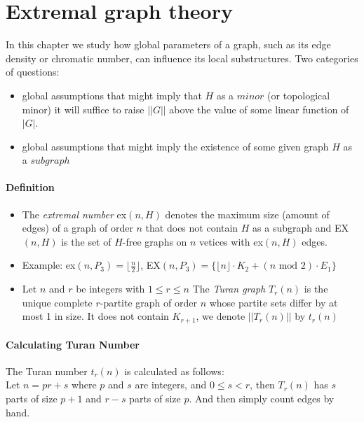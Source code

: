 \section{Extremal graph theory}
In this chapter we study how global parameters of a graph, such as its edge density 
or chromatic number, can influence its local substructures.
Two categories of questions:
\begin{itemize}
    \item global assumptions that might imply that $ H $ as a $minor$ (or topological minor)
    it will suffice to raise $ ||G|| $ above the value of some linear function 
    of $|G|$.
    \item global assumptions that might imply the existence of some given graph $ H $ 
    as  a $subgraph$ 
\end{itemize}

\paragraph{Definition} 
\begin{itemize}
    \item The \textit{extremal number} ex$(n,H)$ denotes the maximum
        size (amount of edges) of a graph of order $ n $ that does not contain
        $ H $ as a subgraph and EX$(n,H)$ is the set of $H$-free graphs on $n$
        vetices with ex$(n,H)$ edges.
    \item Example: ex$(n,P_3) = \lfloor\frac{n}{2}\rfloor$, EX$(n,P_3)
    = \{\lfloor n\rfloor \cdot K_2 + (n \text{ mod } 2) \cdot E_1\} $
    \item Let $ n $ and $ r $ be integers with $ 1 \leq r \leq n $ The 
    \textit{Turan graph} $T_r(n)$ is the unique complete $r$-partite graph of order 
    $n$ whose partite sets differ by at most 1 in size. It does not contain 
    $K_{r+1}$, we denote $||T_r(n)||$ by $t_r(n)$
\end{itemize}

\paragraph{Calculating Turan Number}
The Turan number $t_r(n)$ is calculated as follows:\\
Let $n = pr + s$ where $ p $ and $ s $ are integers, and 
$ 0 \leq s < r $, then $ T_r(n) $ has $ s $ parts of size $p + 1$
and $r - s$ parts of size $ p$. And then simply count edges by hand.

